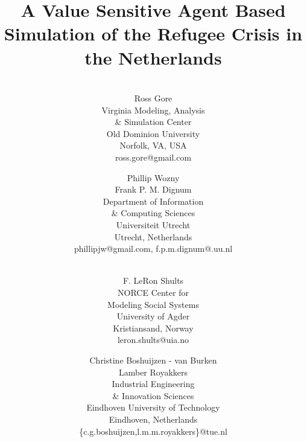 \documentclass{scspaperproc}
\theoremstyle{scsthe}
\begin{document}
\title{A Value Sensitive Agent Based Simulation of the Refugee Crisis in the Netherlands}

\author{
\\%
Ross Gore \\ [12pt]
Virginia Modeling, Analysis \\ \& Simulation Center \\
Old Dominion University \\
Norfolk, VA, USA \\
ross.gore@gmail.com\\
\and
Phillip Wozny \\
Frank P. M. Dignum \\ [12pt]
Department of Information \\ \& Computing Sciences \\
Universiteit Utrecht \\
Utrecht, Netherlands \\
phillipjw@gmail.com, f.p.m.dignum@.uu.nl \\
\and
\\%
F. LeRon Shults \\ [12pt]
NORCE Center for \\ Modeling Social Systems \\
University of Agder \\
Kristiansand, Norway \\
leron.shults@uia.no \\
\and
Christine Boshuijzen - van Burken \\ 
Lamber Royakkers \\ [12pt]
Industrial Engineering \\ \& Innovation Sciences \\
Eindhoven University of Technology \\
Eindhoven, Netherlands \\
\{c.g.boshuijzen,l.m.m.royakkers\}@tue.nl
}
\end{document}

